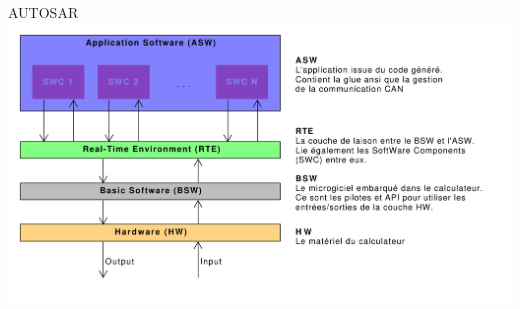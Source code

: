 \documentclass[xcolor=x11names,compress]{beamer}
\begin{document}
\begin{frame}{AUTOSAR}
  \centering
  \includegraphics[scale=0.40]{images/autosar_arch}
\end{frame}
\end{document}
